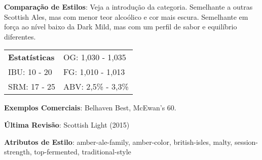 \textbf{Comparação de Estilos}: Veja a introdução da categoria. Semelhante a outras Scottish Ales, mas com menor teor alcoólico e cor mais escura. Semelhante em força ao nível baixo da Dark Mild, mas com um perfil de sabor e equilíbrio diferentes.

\begin{tabular}{@{}p{35mm}p{35mm}@{}}
  \textbf{Estatísticas} & OG: 1,030 - 1,035 \\
  IBU: 10 - 20  & FG: 1,010 - 1,013  \\
  SRM: 17 - 25  & ABV: 2,5\% - 3,3\%
\end{tabular}

\textbf{Exemplos Comerciais}: Belhaven Best, McEwan's 60.

\textbf{Última Revisão}: Scottish Light (2015)

\textbf{Atributos de Estilo}: amber-ale-family, amber-color, british-isles, malty, session-strength, top-fermented, traditional-style